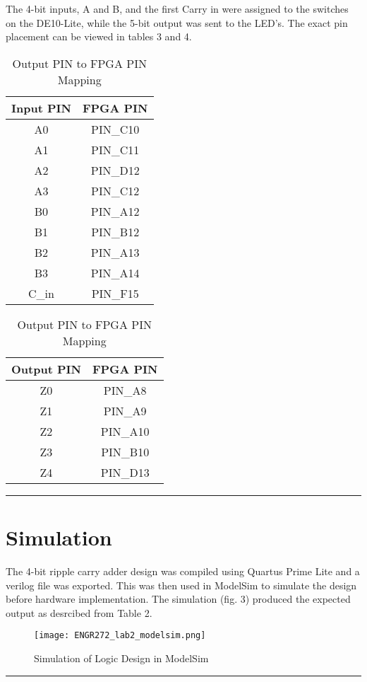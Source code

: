 \documentclass[11pt]{article}
\begin{document}
The 4-bit inputs, A and B, and the first Carry in were assigned to the switches on the DE10-Lite, while the 5-bit output was sent to the LED's. The exact pin placement can be viewed in tables 3 and 4.
\begin{table}[H]
  \centering
  \begin{minipage}{0.45\textwidth}
    \centering
    \begin{tabular}{|c|c|}
      \hline
      \textbf{Input PIN} & \textbf{FPGA PIN} \\
      \hline
      A0 & PIN\_C10 \\
      \hline
      A1 & PIN\_C11 \\
      \hline
      A2 & PIN\_D12 \\
      \hline
      A3 & PIN\_C12 \\
      \hline
      B0 & PIN\_A12 \\
      \hline
      B1 & PIN\_B12 \\
      \hline
      B2 & PIN\_A13 \\
      \hline
      B3 & PIN\_A14 \\
      \hline
      C\_in & PIN\_F15 \\
      \hline
    \end{tabular}
    \caption{Input PIN to FPGA PIN Mapping}
  \end{minipage}\hfill
  \begin{minipage}{0.45\textwidth}
    \centering
    \begin{tabular}{|c|c|}
      \hline
      \textbf{Output PIN} & \textbf{FPGA PIN} \\
      \hline
      Z0 & PIN\_A8 \\
      \hline
      Z1 & PIN\_A9 \\
      \hline
      Z2 & PIN\_A10 \\
      \hline
      Z3 & PIN\_B10 \\
      \hline
      Z4 & PIN\_D13 \\
      \hline
    \end{tabular}
    \caption{Output PIN to FPGA PIN Mapping}
  \end{minipage}
\end{table}


\vspace{5mm}
\hrule

\section*{\textcolor{mycolor}{Simulation}}
The 4-bit ripple carry adder design was compiled using Quartus Prime Lite and a verilog file was exported. This was then used in ModelSim to simulate the design before hardware implementation. The simulation (fig. 3) produced the expected output as desrcibed from Table 2.
\begin{figure}[H]
  \centering
  \texttt{[image: ENGR272\_lab2\_modelsim.png]}
  \caption{Simulation of Logic Design in ModelSim}
  \label{fig:3}
\end{figure}
\vspace{5mm}
\hrule
\end{document}
